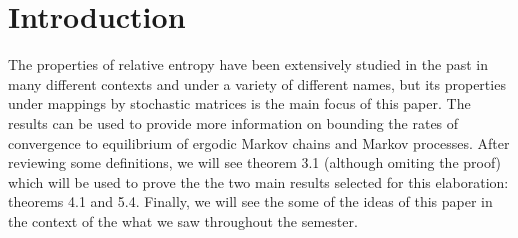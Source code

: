 \section{Introduction}
The properties of relative entropy have been extensively studied in the past in many different contexts and under a variety of different names, but its properties under mappings by stochastic matrices is the main focus of this paper. The results can be used to provide more information on bounding the rates of convergence to equilibrium of ergodic Markov chains and Markov processes. After reviewing some definitions, we will see theorem 3.1 (although omiting the proof) which will be used to prove the the two main results selected for this elaboration: theorems 4.1 and 5.4. Finally, we will see the some of the ideas of this paper in the context of the what we saw throughout the semester.
